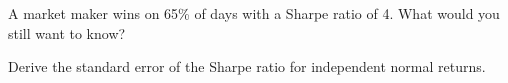 \begin{interviewq}\label{iq:rs:performance-measurement:5}
A market maker wins on 65\% of days with a Sharpe ratio of 4. What would you still want to know?
\end{interviewq}

\begin{interviewq}\label{iq:rs:performance-measurement:6}
Derive the standard error of the Sharpe ratio for independent normal returns.
\end{interviewq}
